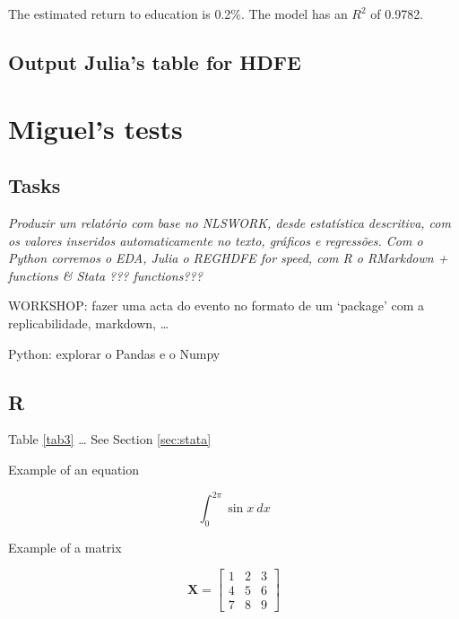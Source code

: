 \documentclass[
  12pt,
]{article}
\begin{document}
\vspace{0.3cm}

The estimated return to education is 0.2\%. The model has an \(R^2\) of 0.9782.

\hypertarget{output-julias-table-for-hdfe}{%
\subsection{Output Julia's table for HDFE}\label{output-julias-table-for-hdfe}}

\begin{table}[ht]
\label{tab:hdfe}
  
\end{table}

\hypertarget{miguels-tests}{%
\section{Miguel's tests}\label{miguels-tests}}

\hypertarget{tasks}{%
\subsection{Tasks}\label{tasks}}

\emph{Produzir um relatório com base no NLSWORK, desde estatística descritiva, com os valores inseridos automaticamente no texto, gráficos e regressões. Com o Python corremos o EDA, Julia o REGHDFE for speed, com R o RMarkdown + functions \& Stata ??? functions???}

WORKSHOP: fazer uma acta do evento no formato de um `package' com a replicabilidade, markdown, \ldots{}

Python: explorar o Pandas e o Numpy

\hypertarget{r}{%
\subsection{R}\label{r}}

Table \ref{tab3} \ldots{} See Section \ref{sec:stata}

Example of an equation

\[\int_0^{2\pi} \sin x~dx\]

Example of a matrix

\[\mathbf{X} = \left[\begin{array}
{rrr}
1 & 2 & 3 \\
4 & 5 & 6 \\
7 & 8 & 9
\end{array}\right]
\]
\end{document}

